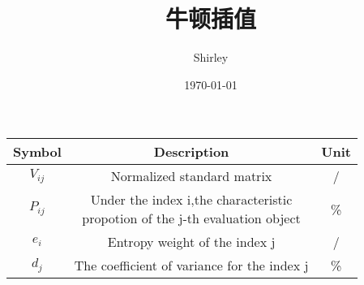 \documentclass{ctexart}%
\title{\kaishu 牛顿插值}
\author{Shirley}
\date{\today}
\begin{document}
	\begin{tabular}{c c c}
		\hline
		Symbol & Description & Unit\\
		\hline
		$V_{ij}$ & Normalized standard matrix & / \\
		$P_{ij}$ & \makecell[c]{Under the index i,the characteristic \\ propotion of the j-th evaluation object} & \%  \\ %
		$e_{i}$ & Entropy weight of the index j & / \\
		$d_{j}$ & The coefficient of variance for the index j & \% \\ 
		\hline
	\end{tabular}
	
\end{document}
